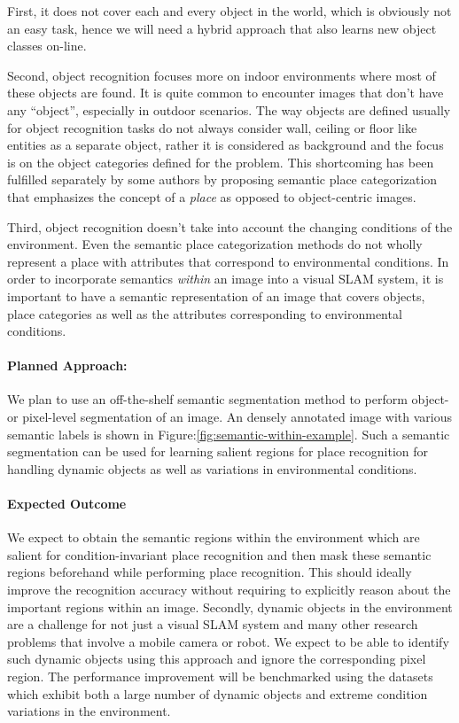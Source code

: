 \documentclass{article}
\begin{document}
First, it does not cover each and every object in the world, which is obviously not an easy task, hence we will need a hybrid approach that also learns new object classes on-line. 

Second, object recognition focuses more on indoor environments where most of these objects are found. It is quite common to encounter images that don't have any ``object'', especially in outdoor scenarios. The way objects are defined usually for object recognition tasks do not always consider wall, ceiling or floor like entities as a separate object, rather it is considered as background and the focus is on the object categories defined for the problem. This shortcoming has been fulfilled separately by some authors by proposing semantic place categorization that emphasizes the concept of a \emph{place} as opposed to object-centric images.

Third, object recognition doesn't take into account the changing conditions of the environment. Even the semantic place categorization methods do not wholly represent a place with attributes that correspond to environmental conditions. In order to incorporate semantics \emph{within} an image into a visual SLAM system, it is important to have a semantic representation of an image that covers objects, place categories as well as the attributes corresponding to environmental conditions. 

\paragraph{Planned Approach:}
We plan to use an off-the-shelf semantic segmentation method to perform object- or pixel-level segmentation of an image. An densely annotated image with various semantic labels is shown in Figure:\ref{fig:semantic-within-example}. Such a semantic segmentation can be used for learning salient regions for place recognition for handling dynamic objects as well as variations in environmental conditions.

\paragraph{Expected Outcome}
We expect to obtain the semantic regions within the environment which are salient for condition-invariant place recognition and then mask these semantic regions beforehand while performing place recognition. This should ideally improve the recognition accuracy without requiring to explicitly reason about the important regions within an image. Secondly, dynamic objects in the environment are a challenge for not just a visual SLAM system and many other research problems that involve a mobile camera or robot. We expect to be able to identify such dynamic objects using this approach and ignore the corresponding pixel region. The performance improvement will be benchmarked using the datasets which exhibit both a large number of dynamic objects and extreme condition variations in the environment.
\end{document}
